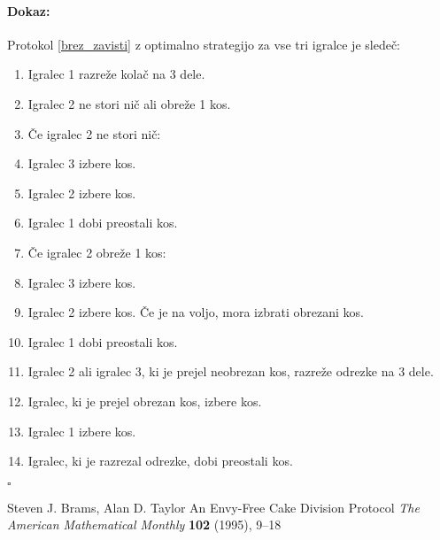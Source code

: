 \documentclass[a4paper, 12pt]{article}
\newenvironment{dokaz}{\paragraph{Dokaz:}}{\hfill$\square$\\}
\begin{document}
	\begin{dokaz}
		Protokol \ref{brez_zavisti} z optimalno strategijo za vse tri igralce je sledeč:
		\begin{enumerate}
			
			\item Igralec 1 razreže kolač na 3 dele.
			
			\item Igralec 2 ne stori nič ali obreže 1 kos.
			
			\item[] Če igralec 2 ne stori nič:
			
			\item \qquad Igralec 3 izbere kos.
			
			\item \qquad Igralec 2 izbere kos.
			
			\item \qquad Igralec 1 dobi preostali kos.
			
			\item[] Če igralec 2 obreže 1 kos:
			
			\setcounter{enumi}{2}
			
			\item \qquad Igralec 3 izbere kos.
			
			\item \qquad Igralec 2 izbere kos. Če je na voljo, mora izbrati obrezani kos.
			
			\item \qquad Igralec 1 dobi preostali kos.
			
			\item \qquad Igralec 2 ali igralec 3, ki je prejel neobrezan kos, razreže odrezke na 3 dele.
			
			\item \qquad Igralec, ki je prejel obrezan kos, izbere kos.
			
			\item \qquad Igralec 1 izbere kos.
			
			\item \qquad Igralec, ki je razrezal odrezke, dobi preostali kos.
			
		\end{enumerate}
	\end{dokaz}
	
	\pagebreak
	
	\begin{thebibliography}{5}
		
		Steven J. Brams, Alan D. Taylor
		An Envy-Free Cake Division Protocol
		\textit{The American Mathematical Monthly} \textbf{102} (1995), 9–18
		
	\end{thebibliography}
	
\end{document}

